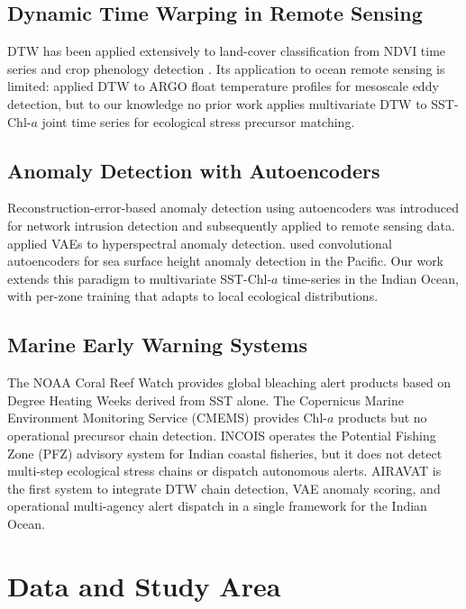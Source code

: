 \documentclass[journal]{IEEEtran}
\begin{document}
\subsection{Dynamic Time Warping in Remote Sensing}

DTW has been applied extensively to land-cover classification from
NDVI time series \cite{maus2016} and crop phenology detection
\cite{guan2020}. Its application to ocean remote sensing is limited:
\citeauthor{jones2021} applied DTW to ARGO float temperature profiles
for mesoscale eddy detection, but to our knowledge no prior work
applies multivariate DTW to SST-Chl-$a$ joint time series for
ecological stress precursor matching.

\subsection{Anomaly Detection with Autoencoders}

Reconstruction-error-based anomaly detection using autoencoders was
introduced for network intrusion detection \cite{sakurada2014} and
subsequently applied to remote sensing data. \citeauthor{chen2020}
applied VAEs to hyperspectral anomaly detection. \citeauthor{li2022}
used convolutional autoencoders for sea surface height anomaly
detection in the Pacific. Our work extends this paradigm to multivariate
SST-Chl-$a$ time-series in the Indian Ocean, with per-zone training
that adapts to local ecological distributions.

\subsection{Marine Early Warning Systems}

The NOAA Coral Reef Watch \cite{liu2014} provides global bleaching
alert products based on Degree Heating Weeks derived from SST alone.
The Copernicus Marine Environment Monitoring Service (CMEMS) provides
Chl-$a$ products but no operational precursor chain detection.
INCOIS operates the Potential Fishing Zone (PFZ) advisory system
for Indian coastal fisheries, but it does not detect multi-step
ecological stress chains or dispatch autonomous alerts. AIRAVAT is
the first system to integrate DTW chain detection, VAE anomaly
scoring, and operational multi-agency alert dispatch in a single
framework for the Indian Ocean.

\section{Data and Study Area}
\label{sec:data}
\end{document}
